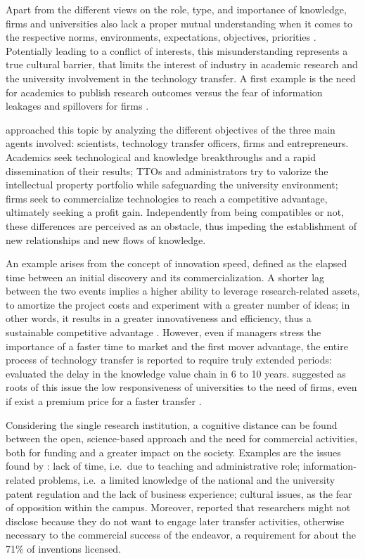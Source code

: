 Apart from the different views on the role, type, and importance of knowledge, firms and universities also lack a proper mutual understanding when it comes to the respective norms, environments, expectations, objectives, priorities \citep{Siegel2003a, Link2005, Muscio2010}. Potentially leading to a conflict of interests, this misunderstanding represents a true cultural barrier, that limits the interest of industry in academic research and the university involvement in the technology transfer. A first example is the need for academics to publish research outcomes versus the fear of information leakages and spillovers for firms \citep{Gilsing2011}.

\citet{Siegel2007} approached this topic by analyzing the different objectives of the three main agents involved: scientists, technology transfer officers, firms and entrepreneurs. Academics seek technological and knowledge breakthroughs and a rapid dissemination of their results; TTOs and administrators try to valorize the intellectual property portfolio while safeguarding the university environment; firms seek to commercialize technologies to reach a competitive advantage, ultimately seeking a profit gain. Independently from being compatibles or not, these differences are perceived as an obstacle, thus impeding the establishment of new relationships and new flows of knowledge.

An example arises from the concept of innovation speed, defined as the elapsed time between an initial discovery and its commercialization. A shorter lag between the two events implies a higher ability to leverage research-related assets, to amortize the project costs and experiment with a greater number of ideas; in other words, it results in a greater innovativeness and efficiency, thus a sustainable competitive advantage \citep{Markman2005}. However, even if managers stress the importance of a faster time to market and the first mover advantage, the entire process of technology transfer is reported to require truly extended periods: \citet{Heher2006} evaluated the delay in the knowledge value chain in 6 to 10 years. \citet{Link2005} suggested as roots of this issue the low responsiveness of universities to the need of firms, even if exist a premium price for a faster transfer \citep{Markman2005}.

Considering the single research institution, a cognitive distance can be found between the open, science-based approach and the need for commercial activities, both for funding and a greater impact on the society. Examples are the issues found by \citet{Baldini2007}: lack of time, i.e.\ due to teaching and administrative role; information-related problems, i.e.\ a limited knowledge of the national and the university patent regulation and the lack of business experience; cultural issues, as the fear of opposition within the campus. Moreover, \citet{Jensen2003} reported that researchers might not disclose because they do not want to engage later transfer activities, otherwise necessary to the commercial success of the endeavor, a requirement for about the 71\% of inventions licensed.

